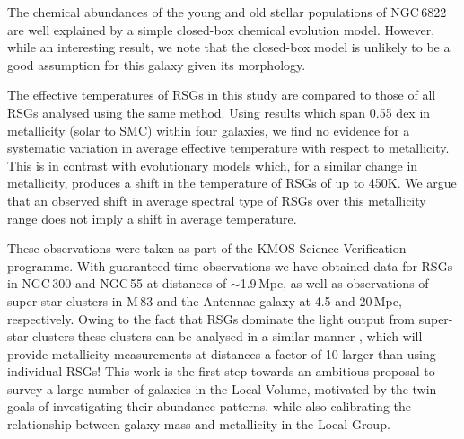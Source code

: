 The chemical abundances of the young and old stellar populations of NGC\,6822 are well explained by a simple closed-box chemical evolution model.
However, while an interesting result, we note that the closed-box model is unlikely to be a good assumption for this galaxy given its morphology.

The effective temperatures of RSGs in this study are compared to those of all RSGs analysed using the same method.
Using results which span 0.55 dex in metallicity (solar to SMC) within four galaxies, we find no evidence for a systematic variation in average effective temperature with respect to metallicity.
This is in contrast with evolutionary models which, for a  similar change in metallicity, produces a shift in the temperature of RSGs of up to 450K.
We argue that an observed shift in average spectral type of RSGs over this metallicity range does not imply a shift in average temperature.

These observations were taken as part of the KMOS Science Verification programme.
With guaranteed time observations we have obtained data for RSGs in NGC\,300 and NGC\,55 at distances of $\sim$1.9\,Mpc,
as well as observations of super-star clusters in M\,83 and the Antennae galaxy at 4.5 and 20\,Mpc, respectively.
Owing to the fact that RSGs dominate the light output from super-star clusters
\citep{2013MNRAS.430L..35G} these clusters can be analysed in a similar manner
\citep{2014ApJ...787..142G},
which will provide metallicity measurements at distances a factor of 10 larger than using individual RSGs!
This work is the first step towards an ambitious proposal to survey a large number of galaxies in the Local Volume,
motivated by the twin goals of investigating their abundance patterns,
while also calibrating the relationship between galaxy mass and metallicity in the Local Group.





